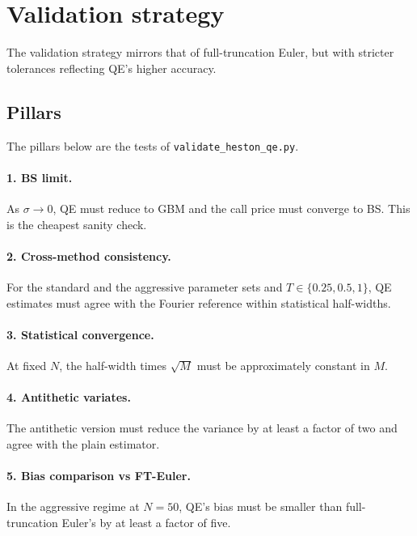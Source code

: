 \documentclass[11pt]{article}
\theoremstyle{plain}
\theoremstyle{definition}
\theoremstyle{remark}
\begin{document}
\section{Validation strategy}

The validation strategy mirrors that of full-truncation Euler, but with stricter tolerances reflecting QE's higher accuracy.

\subsection{Pillars}

The pillars below are the tests of \texttt{validate\_heston\_qe.py}.

\paragraph{1. BS limit.} As $\sigma \to 0$, QE must reduce to GBM and the call price must converge to BS. This is the cheapest sanity check.

\paragraph{2. Cross-method consistency.} For the standard and the aggressive parameter sets and $T \in \{0.25, 0.5, 1\}$, QE estimates must agree with the Fourier reference within statistical half-widths.

\paragraph{3. Statistical convergence.} At fixed $N$, the half-width times $\sqrt{M}$ must be approximately constant in $M$.

\paragraph{4. Antithetic variates.} The antithetic version must reduce the variance by at least a factor of two and agree with the plain estimator.

\paragraph{5. Bias comparison vs FT-Euler.} In the aggressive regime at $N = 50$, QE's bias must be smaller than full-truncation Euler's by at least a factor of five.
\end{document}

